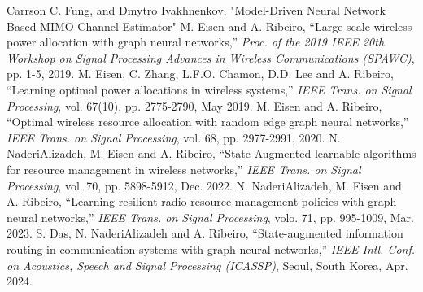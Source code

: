 \documentclass[a4paper, onecolumn, , 11pt]{IEEEtran}
\begin{document}
    \begin{thebibliography}{1}
        Carrson C. Fung, and Dmytro Ivakhnenkov, "Model-Driven Neural Network Based MIMO Channel Estimator"
        M. Eisen and A. Ribeiro, ``Large scale wireless power allocation with graph neural networks,'' \emph{Proc. of the 2019 IEEE 20th Workshop on Signal Processing Advances in Wireless Communications (SPAWC)}, pp. 1-5, 2019.
        M. Eisen, C. Zhang, L.F.O. Chamon, D.D. Lee and A. Ribeiro, ``Learning optimal power allocations in wireless systems,'' \emph{IEEE Trans. on Signal Processing}, vol. 67(10), pp. 2775-2790, May 2019.
        M. Eisen and A. Ribeiro, ``Optimal wireless resource allocation with random edge graph neural networks,'' \emph{IEEE Trans. on Signal Processing}, vol. 68, pp. 2977-2991, 2020.
        N. NaderiAlizadeh, M. Eisen and A. Ribeiro, ``State-Augmented learnable algorithms for resource management in wireless networks,'' \emph{IEEE Trans. on Signal Processing}, vol. 70, pp. 5898-5912, Dec. 2022.
        N. NaderiAlizadeh, M. Eisen and A. Ribeiro, ``Learning resilient radio resource management policies with graph neural networks,'' \emph{IEEE Trans. on Signal Processing}, volo. 71, pp. 995-1009, Mar. 2023.
        S. Das, N. NaderiAlizadeh and A. Ribeiro, ``State-augmented information routing in communication systems with graph neural networks,''  \emph{IEEE Intl. Conf. on Acoustics, Speech and Signal Processing (ICASSP)}, Seoul, South Korea, Apr. 2024.
    \end{thebibliography}
\end{document}
